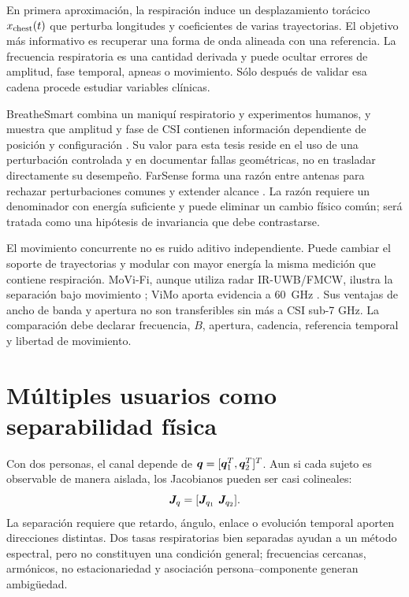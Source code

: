 En primera aproximación, la respiración induce un desplazamiento torácico
$x_{\rm chest}(t)$ que perturba longitudes y coeficientes de varias trayectorias.
El objetivo más informativo es recuperar una forma de onda alineada con una
referencia. La frecuencia respiratoria es una cantidad derivada y puede ocultar
errores de amplitud, fase temporal, apneas o movimiento. Sólo después de validar
esa cadena procede estudiar variables clínicas.

BreatheSmart combina un maniquí respiratorio y experimentos humanos, y muestra
que amplitud y fase de CSI contienen información dependiente de posición y
configuración \citep{Mosleh2022BreatheSmart}. Su valor para esta tesis reside en
el uso de una perturbación controlada y en documentar fallas geométricas, no en
trasladar directamente su desempeño. FarSense forma una razón entre antenas para
rechazar perturbaciones comunes y extender alcance \citep{Zeng2019FarSense}. La
razón requiere un denominador con energía suficiente y puede eliminar un cambio
físico común; será tratada como una hipótesis de invariancia que debe contrastarse.

El movimiento concurrente no es ruido aditivo independiente. Puede cambiar el
soporte de trayectorias y modular con mayor energía la misma medición que contiene
respiración. MoVi-Fi, aunque utiliza radar IR-UWB/FMCW, ilustra la separación bajo
movimiento \citep{Chen2022MoViFi}; ViMo aporta evidencia a \SI{60}{GHz}
\citep{Wang2020ViMo}. Sus ventajas de ancho de banda y apertura no son transferibles
sin más a CSI sub-7 GHz. La comparación debe declarar frecuencia, $B$, apertura,
cadencia, referencia temporal y libertad de movimiento.

\section{Múltiples usuarios como separabilidad física}

Con dos personas, el canal depende de $\bm{q}=[\bm{q}_1^T,\bm{q}_2^T]^T$. Aun
si cada sujeto es observable de manera aislada, los Jacobianos pueden ser casi
colineales:
\begin{equation}
\mat J_q=[\mat J_{q_1}\ \mat J_{q_2}].
\end{equation}
La separación requiere que retardo, ángulo, enlace o evolución temporal aporten
direcciones distintas. Dos tasas respiratorias bien separadas ayudan a un método
espectral, pero no constituyen una condición general; frecuencias cercanas,
armónicos, no estacionariedad y asociación persona--componente generan ambigüedad.

